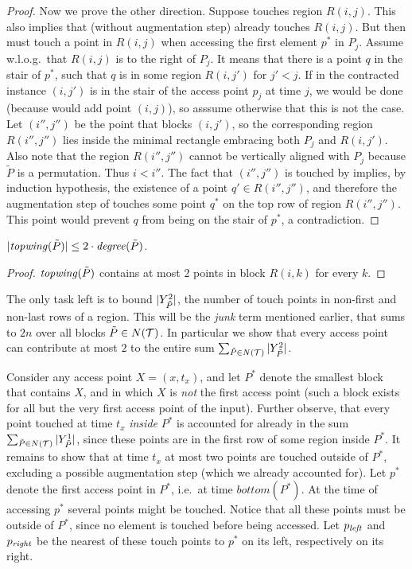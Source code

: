 \begin{proof}
Now we prove the other direction. Suppose \agreedy touches region $R(i,j)$. This also implies that \greedy (without augmentation step) already touches $R(i,j)$.  But then \greedy must touch a point in $R(i,j)$ when accessing the first element $p^*$ in $P_j$. Assume w.l.o.g.\ that $R(i,j)$ is to the right of $P_j$. It means that there is a point $q$ in the stair of $p^*$, such that $q$ is in some region $R(i,j')$ for $j' < j$.
If in the contracted instance $(i,j')$ is in the stair of the access point $p_j$ at time $j$, we would be done (because \greedy would add point $(i,j)$), so asssume otherwise that this is not the case. Let $(i'',j'')$ 
be the point that blocks $(i,j')$, so the corresponding region $R(i'',j'')$ lies inside the minimal rectangle embracing both $P_j$ and $R(i,j')$.  Also note that the region $R(i'',j'')$ cannot be vertically aligned with $P_j$ because $\tilde P$ is a permutation. Thus $i < i''$.  
The fact that $(i'',j'')$ is touched by \greedy implies, by induction hypothesis, the existence of a point $q' \in R(i'',j'')$, and therefore the augmentation step of \agreedy touches some point $q^*$ on the top row of region $R(i'',j'')$. This point would prevent $q$ from being on the stair of $p^*$, a contradiction.
\end{proof}

\begin{lemma}$\lvert \mathit{topwing}(\tilde{P})\rvert \le 2 \cdot \mathit{degree}(\tilde{P})$.\end{lemma}
\begin{proof} $\mathit{topwing}(\tilde{P})$ contains at most 2 points in block $R(i,k)$ for every $k$. \end{proof}

The only task left is to bound $|Y_{\tilde{P}}^2|$, the number of touch points in non-first and non-last rows of a region. 
This will be the \textit{junk} term mentioned earlier, that sums to $2n$ over all blocks $\tilde{P} \in N({\mathcal T})$. In particular we show that every access point can contribute at most $2$ to the entire sum $\sum_{\tilde{P} \in N({\mathcal T})} {|Y_{\tilde{P}}^2|}$.



Consider any access point $X = (x,t_x)$, and let $P^*$ denote the smallest block that contains $X$, and in which $X$ is \emph{not} the first access point (such a block exists for all but the very first access point of the input). Further observe, that every point touched at time $t_x$ \emph{inside} $P^*$ is accounted for already in the sum $\sum_{\tilde{P} \in N({\mathcal T})} |Y_{\tilde{P}}^1|$, since these points are in the first row of some region inside $P^*$. It remains to show that at time $t_x$ at most two points are touched outside of $P^*$, excluding a possible \agreedy augmentation step (which we already accounted for). Let $p^*$ denote the first access point in $P^*$, i.e.\ at time $\textit{bottom}(P^*)$. At the time of accessing $p^*$ several points might be touched. Notice that all these points must be outside of $P^*$, since no element is touched before being accessed. Let $p_{\mathit{left}}$ and $p_{\mathit{right}}$ be the nearest of these touch points to $p^*$ on its left, respectively on its right.

